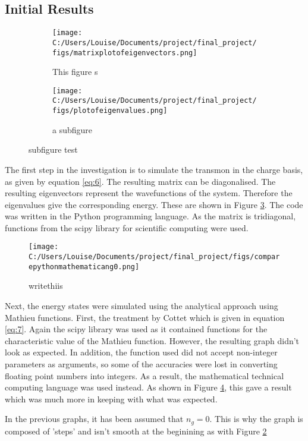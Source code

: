 \documentclass[11pt]{article}
\begin{document}
\subsection{Initial Results}
\begin{figure}[ht]
\centering
\begin{subfigure}{.5\linewidth}
\centering
\texttt{[image: C:/Users/Louise/Documents/project/final\_project/figs/matrixplotofeigenvectors.png]}
\caption{This figure s}
\label{fig:subgraph1}
\end{subfigure}%
\begin{subfigure}{.5\linewidth}
\centering
\texttt{[image: C:/Users/Louise/Documents/project/final\_project/figs/plotofeigenvalues.png]}
\caption{a subfigure}
\label{fig:subgraph2}
\end{subfigure}
\caption{subfigure test}
\label{fig:graph1}
\end{figure}
The first step in the investigation is to simulate the transmon in the charge basis, as given by equation \ref{eq:6}. The resulting matrix can be diagonalised. The resulting eigenvectors represent the wavefunctions of the system. Therefore the eigenvalues give the corresponding energy. These are shown in Figure \ref{fig:graph1}. The code was written in the Python programming language. As the matrix is tridiagonal, functions from the scipy library for scientific computing were used.
\begin{figure} 
\centering
\texttt{[image: C:/Users/Louise/Documents/project/final\_project/figs/comparepythonmathematicang0.png]}
\caption{writethiis}
\label{fig:graph2}
\end{figure}
Next, the energy states were simulated using the analytical approach using Mathieu functions. First, the treatment by Cottet which is given in equation \ref{eq:7}. Again the scipy library was used as it contained functions for the characteristic value of the Mathieu function. However, the resulting graph didn't look as expected. In addition, the function used did not accept non-integer parameters as arguments, so some of the accuracies were lost in converting floating point numbers into integers. As a result, the mathematical technical computing language was used instead. As shown in Figure \ref{fig:graph2}, this gave a result which was much more in keeping with what was expected.

In the previous graphs, it has been assumed that $n_g = 0$. This is why the graph is composed of 'steps' and isn't smooth at the beginining as with Figure \ref{fig:subgraph2}
\end{document}
